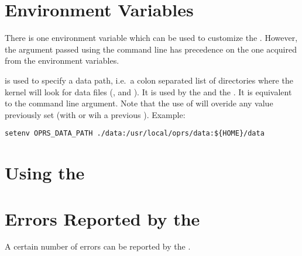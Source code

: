 \section{\OPC{} Environment Variables}

There is one environment variable which can be used to customize the \OPC{}.
However, the argument passed using the command line has precedence on the one
acquired from the environment variables.

\begin{description}


\item[\code{OPRS\_DATA\_PATH}] is used  to specify a data path, i.e.\ a colon separated
list of directories where the kernel will look for data files (,
 and ). It is used by the \CPK{} and the \XPK{}. It is
equivalent to the  command line argument. Note that the use of
 will overide any value previously set (with  
or wih a previous ).\*
Example:
\begin{verbatim}
setenv OPRS_DATA_PATH ./data:/usr/local/oprs/data:${HOME}/data
\end{verbatim}

\end{description}

\section{Using the \OPC{}}

\section{Errors Reported by the \OPC{}}

A certain number of errors can be reported by the \OPC{}.

